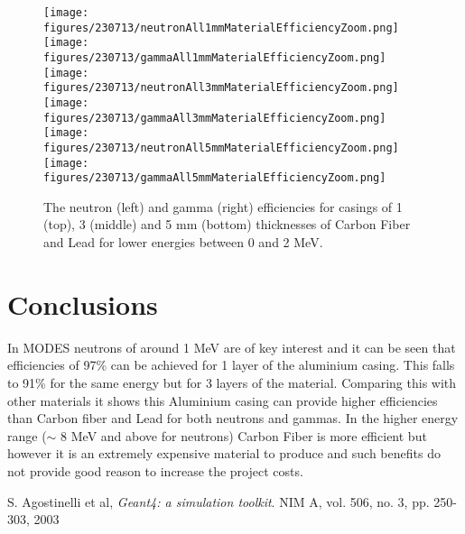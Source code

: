 \documentclass{article}
\begin{document}
\begin{figure}[htbp]
\begin{center}
\texttt{[image: figures/230713/neutronAll1mmMaterialEfficiencyZoom.png]}
\texttt{[image: figures/230713/gammaAll1mmMaterialEfficiencyZoom.png]}
\texttt{[image: figures/230713/neutronAll3mmMaterialEfficiencyZoom.png]}
\texttt{[image: figures/230713/gammaAll3mmMaterialEfficiencyZoom.png]}
\texttt{[image: figures/230713/neutronAll5mmMaterialEfficiencyZoom.png]}
\texttt{[image: figures/230713/gammaAll5mmMaterialEfficiencyZoom.png]}
\caption{The neutron (left) and gamma (right) efficiencies for casings of 1 (top), 3 (middle) and 5 mm (bottom) thicknesses of Carbon Fiber and Lead for lower energies between 0 and 2 MeV.}
\label{fig:efficienciesMaterialZoom}
\end{center}
\end{figure}
\newpage

\section{Conclusions}
In MODES neutrons of around 1 MeV are of key interest and it can be seen that efficiencies of 97\% can be achieved for 1 layer of the aluminium casing. This falls to 91\% for the same energy but for 3 layers of the material. Comparing this with other materials it shows this Aluminium casing can provide higher efficiencies than Carbon fiber and Lead for both neutrons and gammas. In the higher energy range ($\sim$ 8 MeV and above for neutrons) Carbon Fiber is more efficient but however it is an extremely expensive material to produce and such benefits do not provide good reason to increase the project costs. 



%
\begin{thebibliography}{9}
  S. Agostinelli et al,
  \emph{Geant4: a simulation toolkit}.
  NIM A, vol. 506, no. 3, pp. 250-303, 2003

\end{thebibliography}
\end{document}
